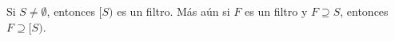   \begin{lemma}
    \PN Si $S \neq \emptyset$, entonces $[S)$ es un filtro. Más aún si $F$ es un filtro y $F \supseteq S$, entonces $F
    \supseteq \lbrack S)$.
  \end{lemma}
